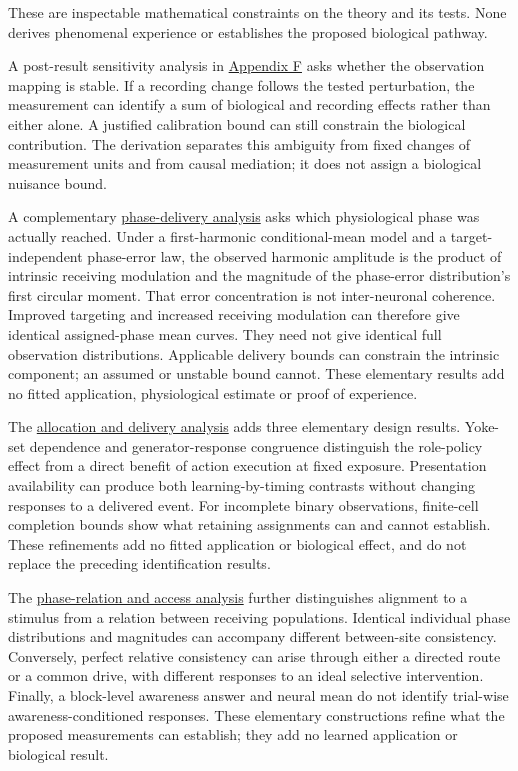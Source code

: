 \documentclass[
  american,
  11pt,
  letterpaper,
]{article}
\begin{document}
These are inspectable mathematical constraints on the theory and its tests. None derives phenomenal experience or establishes the proposed biological pathway.

A post-result sensitivity analysis in \href{https://zenodo.org/records/23509961/files/Learning-to-Feel-Technical-Supplement-v1.1.pdf\#appendix-f}{Appendix F} asks whether the observation mapping is stable. If a recording change follows the tested perturbation, the measurement can identify a sum of biological and recording effects rather than either alone. A justified calibration bound can still constrain the biological contribution. The derivation separates this ambiguity from fixed changes of measurement units and from causal mediation; it does not assign a biological nuisance bound.

A complementary \href{https://zenodo.org/records/23509961/files/Learning-to-Feel-Technical-Supplement-v1.1.pdf\#appendix-g}{phase-delivery analysis} asks which physiological phase was actually reached. Under a first-harmonic conditional-mean model and a target-independent phase-error law, the observed harmonic amplitude is the product of intrinsic receiving modulation and the magnitude of the phase-error distribution's first circular moment. That error concentration is not inter-neuronal coherence. Improved targeting and increased receiving modulation can therefore give identical assigned-phase mean curves. They need not give identical full observation distributions. Applicable delivery bounds can constrain the intrinsic component; an assumed or unstable bound cannot. These elementary results add no fitted application, physiological estimate or proof of experience.

The \href{https://zenodo.org/records/23509961/files/Learning-to-Feel-Technical-Supplement-v1.1.pdf\#appendix-i}{allocation and delivery analysis} adds three elementary design results. Yoke-set dependence and generator-response congruence distinguish the role-policy effect from a direct benefit of action execution at fixed exposure. Presentation availability can produce both learning-by-timing contrasts without changing responses to a delivered event. For incomplete binary observations, finite-cell completion bounds show what retaining assignments can and cannot establish. These refinements add no fitted application or biological effect, and do not replace the preceding identification results.

The \href{https://zenodo.org/records/23509961/files/Learning-to-Feel-Technical-Supplement-v1.1.pdf\#appendix-h}{phase-relation and access analysis} further distinguishes alignment to a stimulus from a relation between receiving populations. Identical individual phase distributions and magnitudes can accompany different between-site consistency. Conversely, perfect relative consistency can arise through either a directed route or a common drive, with different responses to an ideal selective intervention. Finally, a block-level awareness answer and neural mean do not identify trial-wise awareness-conditioned responses. These elementary constructions refine what the proposed measurements can establish; they add no learned application or biological result.
\end{document}
